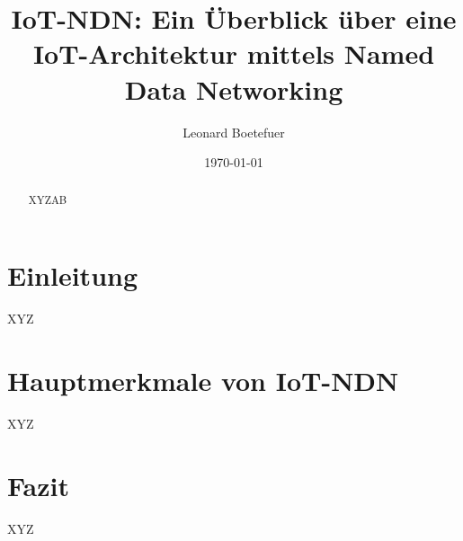 \documentclass[a4paper,12pt]{article}
\title{IoT-NDN: Ein Überblick über eine IoT-Architektur mittels Named Data Networking}
\author{Leonard Boetefuer}
\date{\today}
\begin{document}
\maketitle

\begin{abstract}
XYZAB
\end{abstract}

\section{Einleitung}
XYZ
\section{Hauptmerkmale von IoT-NDN}
XYZ
\section{Fazit}
XYZ
\end{document}
